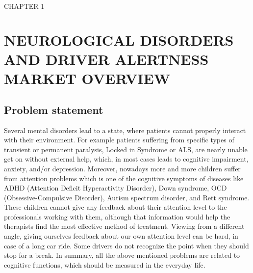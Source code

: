 \documentclass[letterpaper,10pt]{article}
\let\oldsection\section
\let\oldsubsection\subsection
\renewcommand{\section}{\def\cursectioning{section}\oldsection}
\renewcommand{\subsection}{\def\cursectioning{subsection}\oldsubsection}
\begin{document}
\onehalfspacing
\newpage

\pagebreak

\newpage


\vspace{100mm}
\begin{center}
\uppercase{\Large{Chapter 1}}
\section{\uppercase{\large{NEUROLOGICAL DISORDERS AND DRIVER ALERTNESS MARKET OVERVIEW}}}
\vspace{20mm}
\end{center}

\subsection{Problem statement}

Several mental disorders lead to a state, where patients cannot properly interact with their environment. For example patients suffering from specific types of transient or permanent paralysis, Locked in Syndrome or ALS, are nearly unable get on without external help, which, in most cases leads to cognitive impairment, anxiety, and/or depression. Moreover, nowadays more and more children suffer from  attention problems which is one of the cognitive symptoms of  diseases like ADHD (Attention Deficit Hyperactivity Disorder), Down syndrome, OCD (Obsessive-Compulsive Disorder), Autism spectrum disorder, and Rett syndrome. These children cannot give any feedback about their attention level to the professionals working with them, although that information would help the therapists find the most effective method of treatment.
Viewing from a different angle, giving ourselves feedback about our own attention level can be hard, in case of a long car ride. Some drivers do not recognize the point when they should stop  for a break. 
In summary, all the above mentioned problems are related to cognitive functions, which should be measured in the everyday life.
\end{document}
